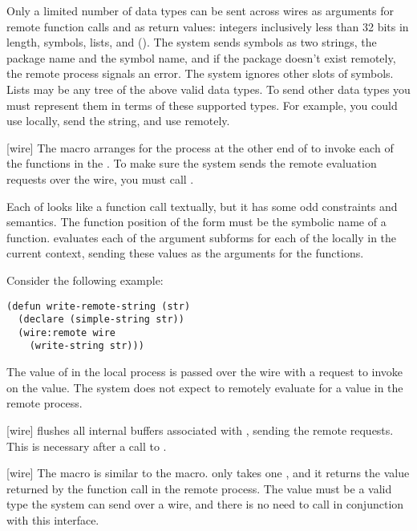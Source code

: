 {Only a limited number of data types can be sent across wires as arguments for
remote function calls and as return values: integers inclusively less than 32
bits in length, symbols, lists, and  ().  The system sends symbols as two strings, the package name
and the symbol name, and if the package doesn't exist remotely, the remote
process signals an error.  The system ignores other slots of symbols.  Lists
may be any tree of the above valid data types.  To send other data types you
must represent them in terms of these supported types.  For example, you could
use  locally, send the string, and use 
remotely.

[wire]{}
The  macro arranges for the process at the other end of  to
invoke each of the functions in the .  To make sure the system
sends the remote evaluation requests over the wire, you must call
.

Each of  looks like a function call textually, but it has some
odd constraints and semantics.  The function position of the form must be the
symbolic name of a function.   evaluates each of the argument
subforms for each of the  locally in the current context, sending
these values as the arguments for the functions.

Consider the following example:
\begin{verbatim}
(defun write-remote-string (str)
  (declare (simple-string str))
  (wire:remote wire
    (write-string str)))
\end{verbatim}
The value of  in the local process is passed over the wire with a
request to invoke  on the value.  The system does not expect to
remotely evaluate  for a value in the remote process.
\enddefmac

[wire]{}
 flushes all internal buffers associated with ,
sending the remote requests.  This is necessary after a call to .
\enddefun

[wire]{}
The  macro is similar to the  macro.
 only takes one , and it returns the value
returned by the function call in the remote process.  The value must be a valid
type the system can send over a wire, and there is no need to call
 in conjunction with this interface.

}

